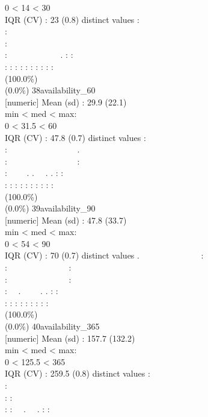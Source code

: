 \documentclass[
  journal,
]{IEEEtran}%
\begin{document}
0 \textless{} 14 \textless{} 30\\
IQR (CV) : 23 (0.8)  distinct values \textbar{} \textbar:\\
:\\
:\\
: ~~~~~~~~~~~~. : :\\
: : : : : : : : : : \\
(100.0\%) \\
(0.0\%) \textbar{} \textbar{} 38\textbar availability\_60\\
{[}numeric{]} \textbar Mean (sd) : 29.9 (22.1)\\
min \textless{} med \textless{} max:\\
0 \textless{} 31.5 \textless{} 60\\
IQR (CV) : 47.8 (0.7)  distinct values \textbar{} \textbar:\\
: ~~~~~~~~~~~~~~~~.\\
: ~~~~~~~~~~~~~~~~:\\
: ~~~~. . ~~. . : :\\
: : : : : : : : : : \\
(100.0\%) \\
(0.0\%) \textbar{} \textbar{} 39\textbar availability\_90\\
{[}numeric{]} \textbar Mean (sd) : 47.8 (33.7)\\
min \textless{} med \textless{} max:\\
0 \textless{} 54 \textless{} 90\\
IQR (CV) : 70 (0.7)  distinct values \textbar{} \textbar.
~~~~~~~~~~~~~~:\\
: ~~~~~~~~~~~~~~:\\
: ~~~~~~~~~~~~~~:\\
: ~~. ~~~~. . : :\\
: : : : : : : : : \\
(100.0\%) \\
(0.0\%) \textbar{} \textbar{} 40\textbar availability\_365\\
{[}numeric{]} \textbar Mean (sd) : 157.7 (132.2)\\
min \textless{} med \textless{} max:\\
0 \textless{} 125.5 \textless{} 365\\
IQR (CV) : 259.5 (0.8)  distinct values \textbar{}
\textbar:\\
:\\
: :\\
: : ~~. ~~. : :\\
\end{document}
